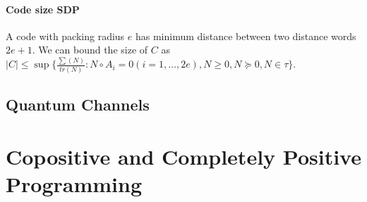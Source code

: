 \documentclass[letterpaper,11pt,oneside,onecolumn]{article}
\begin{document}
\paragraph{Code size SDP} A code with packing radius $e$ has minimum distance between two distance words $2e+1$. We can bound the size of $C$ as $|C| \leq \sup \{ \frac{\sum(N)}{tr(N)} : N \circ A_i = 0 (i = 1, \dots, 2e), N \geq 0, N \succcurlyeq 0, N \in \tau \}$.
\subsection*{Quantum Channels}
\section*{Copositive and Completely Positive Programming}
\end{document}
